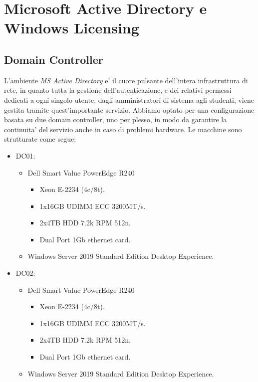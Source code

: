 \documentclass{report}
\begin{document}
    \chapter{Microsoft Active Directory e Windows Licensing}
        \author{Catone Mario}
        \section{Domain Controller}
        L'ambiente \emph{MS Active Directory} e' il cuore pulsante dell'intera infrastruttura di rete, in quanto tutta 
         la gestione dell'autenticazione, e dei relativi permessi dedicati a ogni singolo utente, dagli amministratori
         di sistema agli studenti, viene gestita tramite quest'importante servizio.
        Abbiamo optato per una configurazione basata su due domain controller, uno per plesso, in modo da garantire la
         continuita' del servizio anche in caso di problemi hardware.
        Le macchine sono strutturate come segue:
        \begin{itemize}
        \item DC01:
            \begin{itemize}
            \item Dell Smart Value PowerEdge R240
                \begin{itemize}
                    \item Xeon E-2234 (4c/8t).
                    \item 1x16GB UDIMM ECC 3200MT/s.
                    \item 2x4TB HDD 7.2k RPM 512n.
                    \item Dual Port 1Gb ethernet card.
                \end{itemize}
            \item Windows Server 2019 Standard Edition Desktop Experience.
            \end{itemize}\newpage
        \item DC02: 
            \begin{itemize}
            \item Dell Smart Value PowerEdge R240
                \begin{itemize}
                    \item Xeon E-2234 (4c/8t).
                    \item 1x16GB UDIMM ECC 3200MT/s.
                    \item 2x4TB HDD 7.2k RPM 512n.
                    \item Dual Port 1Gb ethernet card.
                \end{itemize}
            \item Windows Server 2019 Standard Edition Desktop Experience.
            \end{itemize}
        \end{itemize}
\end{document}
